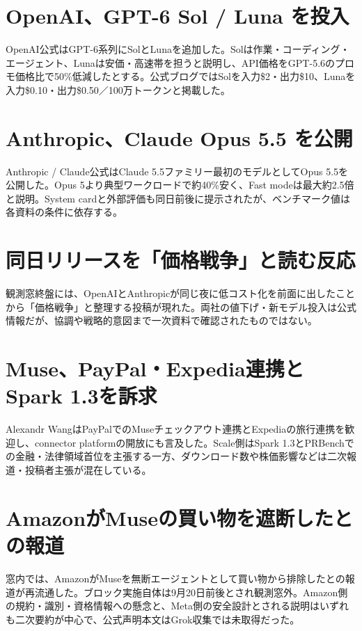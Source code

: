 \section{OpenAI、GPT-6 Sol / Luna を投入}
OpenAI公式はGPT-6系列にSolとLunaを追加した。Solは作業・コーディング・エージェント、Lunaは安価・高速帯を担うと説明し、API価格をGPT-5.6のプロモ価格比で50\%低減したとする。公式ブログではSolを入力\$2・出力\$10、Lunaを入力\$0.10・出力\$0.50／100万トークンと掲載した。

\section{Anthropic、Claude Opus 5.5 を公開}
Anthropic / Claude公式はClaude 5.5ファミリー最初のモデルとしてOpus 5.5を公開した。Opus 5より典型ワークロードで約40\%安く、Fast modeは最大約2.5倍と説明。System cardと外部評価も同日前後に提示されたが、ベンチマーク値は各資料の条件に依存する。

\section{同日リリースを「価格戦争」と読む反応}
観測窓終盤には、OpenAIとAnthropicが同じ夜に低コスト化を前面に出したことから「価格戦争」と整理する投稿が現れた。両社の値下げ・新モデル投入は公式情報だが、協調や戦略的意図まで一次資料で確認されたものではない。

\section{Muse、PayPal・Expedia連携とSpark 1.3を訴求}
Alexandr WangはPayPalでのMuseチェックアウト連携とExpediaの旅行連携を歓迎し、connector platformの開放にも言及した。Scale側はSpark 1.3とPRBenchでの金融・法律領域首位を主張する一方、ダウンロード数や株価影響などは二次報道・投稿者主張が混在している。

\section{AmazonがMuseの買い物を遮断したとの報道}
窓内では、AmazonがMuseを無断エージェントとして買い物から排除したとの報道が再流通した。ブロック実施自体は9月20日前後とされ観測窓外。Amazon側の規約・識別・資格情報への懸念と、Meta側の安全設計とされる説明はいずれも二次要約が中心で、公式声明本文はGrok収集では未取得だった。


